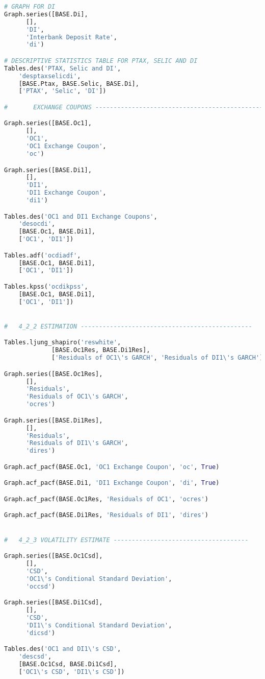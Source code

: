 \begin{lstlisting}[language=Python]
# GRAPH FOR DI
Graph.series([BASE.Di],
      [],
      'DI',
      'Interbank Deposit Rate',
      'di')

# DESCRIPTIVE STATISTICS TABLE FOR PTAX, SELIC AND DI
Tables.des('PTAX, Selic and DI',
    'desptaxselicdi',
    [BASE.Ptax, BASE.Selic, BASE.Di],
    ['PTAX', 'Selic', 'DI'])

#       EXCHANGE COUPONS -------------------------------------------------------

Graph.series([BASE.Oc1],
      [],
      'OC1',
      'OC1 Exchange Coupon',
      'oc')

Graph.series([BASE.Di1],
      [],
      'DI1',
      'DI1 Exchange Coupon',
      'di1')

Tables.des('OC1 and DI1 Exchange Coupons',
    'desocdi',
    [BASE.Oc1, BASE.Di1],
    ['OC1', 'DI1'])

Tables.adf('ocdiadf',
    [BASE.Oc1, BASE.Di1],
    ['OC1', 'DI1'])

Tables.kpss('ocdikpss',
    [BASE.Oc1, BASE.Di1],
    ['OC1', 'DI1'])


#   4_2_2 ESTIMATION -----------------------------------------------

Tables.ljung_shapiro('reswhite',
             [BASE.Oc1Res, BASE.Di1Res],
             ['Residuals of OC1\'s GARCH', 'Residuals of DI1\'s GARCH'])

Graph.series([BASE.Oc1Res],
      [],
      'Residuals',
      'Residuals of OC1\'s GARCH',
      'ocres')

Graph.series([BASE.Di1Res],
      [],
      'Residuals',
      'Residuals of DI1\'s GARCH',
      'dires')

Graph.acf_pacf(BASE.Oc1, 'OC1 Exchange Coupon', 'oc', True)

Graph.acf_pacf(BASE.Di1, 'DI1 Exchange Coupon', 'di', True)

Graph.acf_pacf(BASE.Oc1Res, 'Residuals of OC1', 'ocres')

Graph.acf_pacf(BASE.Di1Res, 'Residuals of DI1', 'dires')


#   4_2_3 VOLATILITY ESTIMATE -------------------------------------

Graph.series([BASE.Oc1Csd],
      [],
      'CSD',
      'OC1\'s Conditional Standard Deviation',
      'occsd')

Graph.series([BASE.Di1Csd],
      [],
      'CSD',
      'DI1\'s Conditional Standard Deviation',
      'dicsd')

Tables.des('OC1 and DI1\'s CSD',
    'descsd',
    [BASE.Oc1Csd, BASE.Di1Csd],
    ['OC1\'s CSD', 'DI1\'s CSD'])


\end{lstlisting}
